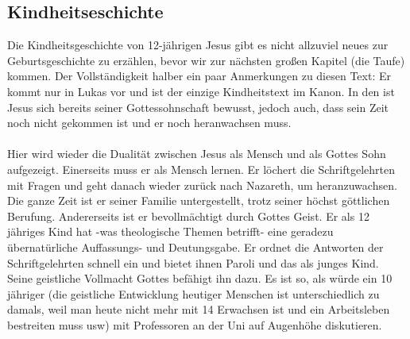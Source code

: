 \subsection{Kindheitseschichte}
Die Kindheitsgeschichte von 12-jährigen Jesus gibt es nicht allzuviel neues zur Geburtsgeschichte zu erzählen, bevor wir zur nächsten großen Kapitel (die Taufe) kommen. Der Vollständigkeit halber ein paar Anmerkungen zu diesen Text: Er kommt nur in Lukas vor und ist der einzige Kindheitstext im Kanon. In den ist Jesus sich bereits seiner Gottessohnschaft bewusst, jedoch auch, dass sein Zeit noch nicht gekommen ist und er noch heranwachsen muss.
\\~\\
Hier wird wieder die Dualität zwischen Jesus als Mensch und als Gottes Sohn aufgezeigt. Einerseits muss er als Mensch lernen. Er löchert die Schriftgelehrten mit Fragen und geht danach wieder zurück nach Nazareth, um heranzuwachsen. Die ganze Zeit ist er seiner Familie untergestellt, trotz seiner höchst göttlichen Berufung. Andererseits ist er bevollmächtigt durch Gottes Geist. Er als 12 jähriges Kind hat -was theologische Themen betrifft- eine geradezu übernatürliche Auffassungs- und Deutungsgabe. Er ordnet die Antworten der Schriftgelehrten schnell ein und bietet ihnen Paroli und das als junges Kind. Seine geistliche Vollmacht Gottes befähigt ihn dazu. Es ist so, als würde ein 10 jähriger (die geistliche Entwicklung heutiger Menschen ist unterschiedlich zu damals, weil man heute nicht mehr mit 14 Erwachsen ist und ein Arbeitsleben bestreiten muss usw) mit Professoren an der Uni auf Augenhöhe diskutieren.